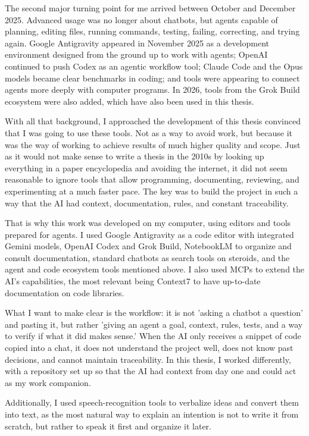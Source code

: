 The second major turning point for me arrived between October and December 2025. Advanced usage was no longer about chatbots, but agents capable of planning, editing files, running commands, testing, failing, correcting, and trying again. Google Antigravity appeared in November 2025 as a development environment designed from the ground up to work with agents; OpenAI continued to push Codex as an agentic workflow tool; Claude Code and the Opus models became clear benchmarks in coding; and tools were appearing to connect agents more deeply with computer programs. In 2026, tools from the Grok Build ecosystem were also added, which have also been used in this thesis.

With all that background, I approached the development of this thesis convinced that I was going to use these tools. Not as a way to avoid work, but because it was the way of working to achieve results of much higher quality and scope. Just as it would not make sense to write a thesis in the 2010s by looking up everything in a paper encyclopedia and avoiding the internet, it did not seem reasonable to ignore tools that allow programming, documenting, reviewing, and experimenting at a much faster pace. The key was to build the project in such a way that the AI had context, documentation, rules, and constant traceability.

That is why this work was developed on my computer, using editors and tools prepared for agents. I used Google Antigravity as a code editor with integrated Gemini models, OpenAI Codex and Grok Build, NotebookLM to organize and consult documentation, standard chatbots as search tools on steroids, and the agent and code ecosystem tools mentioned above. I also used MCPs to extend the AI's capabilities, the most relevant being Context7 to have up-to-date documentation on code libraries.

What I want to make clear is the workflow: it is not 'asking a chatbot a question' and pasting it, but rather 'giving an agent a goal, context, rules, tests, and a way to verify if what it did makes sense.' When the AI only receives a snippet of code copied into a chat, it does not understand the project well, does not know past decisions, and cannot maintain traceability. In this thesis, I worked differently, with a repository set up so that the AI had context from day one and could act as my work companion.

Additionally, I used speech-recognition tools to verbalize ideas and convert them into text, as the most natural way to explain an intention is not to write it from scratch, but rather to speak it first and organize it later.

